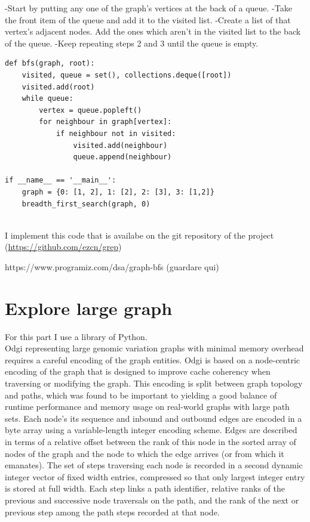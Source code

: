 \documentclass[
tikz,
11pt, %
oneside, %
english, %
singlespacing, %
headsepline, %
]{MastersDoctoralThesisV2} %
\begin{document}
-Start by putting any one of the graph's vertices at the back of a queue.
-Take the front item of the queue and add it to the visited list.
-Create a list of that vertex's adjacent nodes. Add the ones which aren't in the visited list to the back of the queue.
-Keep repeating steps 2 and 3 until the queue is empty.

\begin{verbatim}
def bfs(graph, root): 
    visited, queue = set(), collections.deque([root])
    visited.add(root)
    while queue: 
        vertex = queue.popleft()
        for neighbour in graph[vertex]: 
            if neighbour not in visited: 
                visited.add(neighbour) 
                queue.append(neighbour) 
                
if __name__ == '__main__':
    graph = {0: [1, 2], 1: [2], 2: [3], 3: [1,2]} 
    breadth_first_search(graph, 0)
    
\end{verbatim}

 I implement this code that is availabe on the git repository of the project (\url{https://github.com/ezcn/grep}) 
 
 https://www.programiz.com/dsa/graph-bfs  (guardare qui)
 

\section{Explore large graph }

For this part I use a library of Python.\\ 

Odgi representing large genomic variation graphs with minimal memory overhead requires a careful encoding of the graph entities.
Odgi is based on a node-centric encoding of the graph that is designed to improve
cache coherency when traversing or modifying the graph. This encoding is split
between graph topology and paths, which was found to be important to yielding
a good balance of runtime performance and memory usage on real-world graphs
with large path sets. Each node’s its sequence and inbound and outbound edges
are encoded in a byte array using a variable-length integer encoding scheme.
Edges are described in terms of a relative offset between the rank of this node
in the sorted array of nodes of the graph and the node to which the edge arrives
(or from which it emanates). The set of steps traversing each node is recorded
in a second dynamic integer vector of fixed width entries, compressed so that
only largest integer entry is stored at full width. Each step links a path
identifier, relative ranks of the previous and successive node traversals on the
path, and the rank of the next or previous step among the path steps recorded
at that node. \cite{garrison2020}
\end{document}
